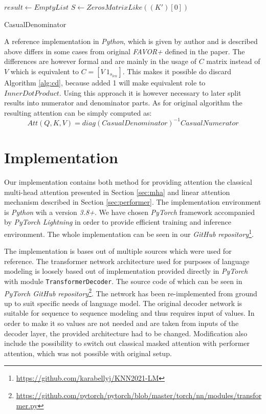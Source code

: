 \begin{algorithm}[H]
\SetAlgoLined
{}
 $result \leftarrow EmptyList$\;
 $S \leftarrow ZerosMatrixLike((K')[0])$\;
 \caption{CasualDenominator}
 \label{alg:cd}
\end{algorithm}
A reference implementation in \textit{Python}, which is given by author and is described above differs in some cases from original \textit{FAVOR+} defined in the paper. The differences are however formal and are mainly in the usage of $C$ matrix instead of $V$ which is equivalent to $C = [V\ 1_{s_{len}}]$. This makes it possible do discard Algorithm \ref{alg:cd}, because added 1 will make equivalent role to $InnerDotProduct$. Using this approach it is however necessary to later split results into numerator and denominator parts. As for original algorithm the resulting attention can be simply computed as:
\begin{equation}
    Att(Q,K,V) = diag(CasualDenominator)^{-1} CasualNumerator
\end{equation}

\section{Implementation}

Our implementation contains both method for providing attention the classical multi-head attention presented in Section \ref{sec:mha} and linear attention mechanism described in Section \ref{sec:performer}. The implementation environment is \textit{Python} wih a version \textit{3.8+}. We have chosen \textit{PyTorch} framework accompanied by \textit{PyTorch Lightning} in order to provide efficient training and inference environment. The whole implementation can be seen in our \textit{GitHub repository}\footnote{\url{https://github.com/karabellyj/KNN2021-LM}}. 

The implementation is bases out of multiple sources which were used for reference. The transformer network architecture used for purposes of language modeling is loosely based out of implementation provided directly in \textit{PyTorch} with module \texttt{TransformerDecoder}. The source code of which can be seen in \textit{PyTorch GitHub repository}\footnote{\url{https://github.com/pytorch/pytorch/blob/master/torch/nn/modules/transformer.py}}. The network has been re-implemented from ground up to suit specific needs of language model. The original decoder network is suitable for sequence to sequence modeling and thus requires input of values. In order to make it so values are not needed and are taken from inputs of the decoder layer, the provided architecture had to be changed. Modification also include the possibility to switch out classical masked attention with performer attention, which was not possible with original setup.

